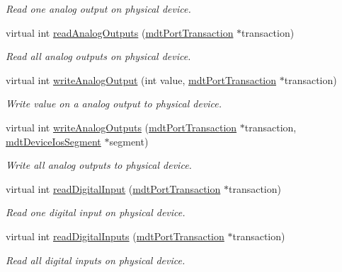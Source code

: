 \begin{DoxyCompactItemize}
\begin{DoxyCompactList}\small\item\em Read one analog output on physical device. \end{DoxyCompactList}\item 
virtual int \hyperlink{classmdt_multi_io_device_ac5629e6ccdeb3bd2a763dad2cfc724fe}{read\-Analog\-Outputs} (\hyperlink{classmdt_port_transaction}{mdt\-Port\-Transaction} $\ast$transaction)
\begin{DoxyCompactList}\small\item\em Read all analog outputs on physical device. \end{DoxyCompactList}\item 
virtual int \hyperlink{classmdt_multi_io_device_a683b5aa97f175cb2979472e1b256c706}{write\-Analog\-Output} (int value, \hyperlink{classmdt_port_transaction}{mdt\-Port\-Transaction} $\ast$transaction)
\begin{DoxyCompactList}\small\item\em Write value on a analog output to physical device. \end{DoxyCompactList}\item 
virtual int \hyperlink{classmdt_multi_io_device_ac6b1b24b8c3eb0722df4079df11e6b71}{write\-Analog\-Outputs} (\hyperlink{classmdt_port_transaction}{mdt\-Port\-Transaction} $\ast$transaction, \hyperlink{classmdt_device_ios_segment}{mdt\-Device\-Ios\-Segment} $\ast$segment)
\begin{DoxyCompactList}\small\item\em Write all analog outputs to physical device. \end{DoxyCompactList}\item 
virtual int \hyperlink{classmdt_multi_io_device_ab8861287c8328873cce6f07ea1ec867a}{read\-Digital\-Input} (\hyperlink{classmdt_port_transaction}{mdt\-Port\-Transaction} $\ast$transaction)
\begin{DoxyCompactList}\small\item\em Read one digital input on physical device. \end{DoxyCompactList}\item 
virtual int \hyperlink{classmdt_multi_io_device_ac9250b0b4d5ea16ee130bfd625960922}{read\-Digital\-Inputs} (\hyperlink{classmdt_port_transaction}{mdt\-Port\-Transaction} $\ast$transaction)
\begin{DoxyCompactList}\small\item\em Read all digital inputs on physical device. \end{DoxyCompactList}\item 

\end{DoxyCompactItemize}
